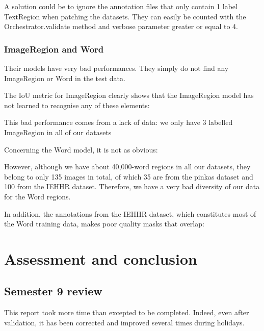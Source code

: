 \documentclass{polytech/polytech}
\numberwithin{figure}{chapter}
\begin{document}
A solution could be to ignore the annotation files that only contain 1 label TextRegion when patching the datasets.
They can easily be counted with the Orchestrator.validate method and verbose parameter greater or equal to 4.


\subsection{ImageRegion and Word}

Their models have very bad performances. They simply do not find any ImageRegion or Word in the test data.

The IoU metric for ImageRegion clearly shows that the ImageRegion model has not learned to recognise any of these elements:

This bad performance comes from a lack of data: we only have 3 labelled ImageRegion in all of our datasets

Concerning the Word model, it is not as obvious:

However, although we have about 40,000-word regions in all our datasets, they belong to only 135 images in total, of which 35 are from the pinkas dataset and 100 from the IEHHR dataset.
Therefore, we have a very bad diversity of our data for the Word regions.

In addition, the annotations from the IEHHR dataset, which constitutes most of the Word training data, makes poor quality masks that overlap:



\chapter{Assessment and conclusion}

\section{Semester 9 review}

This report took more time than excepted to be completed.
Indeed, even after validation, it has been corrected and improved several times during holidays.
\end{document}
